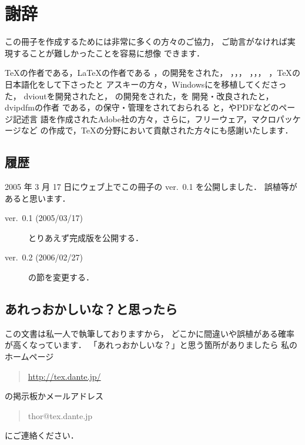 ﻿\chapter{謝辞}
この冊子を作成するためには非常に多くの方々のご協力，
ご助言がなければ実現することが難しかったことを容易に想像
できます．

{\TeX}の作者である，{\LaTeX}の作者である
，{\LaTeXe}の開発をされた，
，，，
，，，
，{\TeX}の日本語化をして下さったと
アスキーの方々，Windowsに{\pTeX}を移植してくださった，
dvioutを開発されたと，
\prog{\BibTeX}の開発をされた，を
開発・改良されたと，dvipdfmの作者
である，{\dvipdfmx}の保守・管理をされておられる
と，{\PS}やPDFなどのページ記述言
語を作成されたAdobe社の方々，さらに，フリーウェア，マクロパッケージなど
の作成で，{\TeX}の分野において貢献された方々にも感謝いたします．



\clearpage
\markboth{}{}
\section*{履歴}

2005 年 3 月 17 日にウェブ上でこの冊子の ver.~0.1 を公開しました．
誤植等があると思います．

\begin{description}
 \item[ver.~0.1 (2005/03/17)] とりあえず完成版を公開する．
 \item[ver.~0.2 (2006/02/27)] の節を変更する．
\end{description}


\section*{あれっおかしいな？と思ったら}
この文書は私一人で執筆しておりますから，
どこかに間違いや誤植がある確率が高くなっています．
「あれっおかしいな？」と思う箇所がありましたら
私のホームページ
\begin{quote}
 \url{http://tex.dante.jp/}
\end{quote}
の掲示板かメールアドレス
\begin{quote}
 {thor@tex.dante.jp}
\end{quote}
にご連絡ください．
